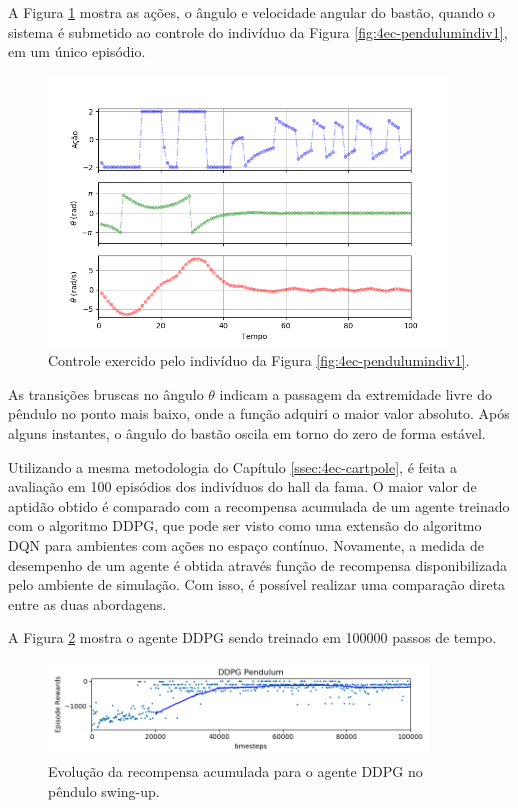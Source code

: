 A Figura \ref{fig:4ec-pendulumgraficosaval} mostra as ações, o ângulo e velocidade angular do bastão, quando o sistema é submetido ao controle do indivíduo da Figura \ref{fig:4ec-pendulumindiv1}, em um único episódio.

\begin{figure}[H]
	\centering
	\includegraphics[width=0.95\textwidth]{02_desenvolvimento/04_EC_Fig_PendulumGraficosAval.png}
	\caption{Controle exercido pelo indivíduo da Figura \ref{fig:4ec-pendulumindiv1}.}
	\label{fig:4ec-pendulumgraficosaval}
\end{figure}

As transições bruscas no ângulo $\theta$ indicam a passagem da extremidade livre do pêndulo no ponto mais baixo, onde a função adquiri o maior valor absoluto. Após alguns instantes, o ângulo do bastão oscila em torno do zero de forma estável.

Utilizando a mesma metodologia do Capítulo \ref{ssec:4ec-cartpole}, é feita a avaliação em 100 episódios dos indivíduos do hall da fama. O maior valor de aptidão obtido é comparado com a recompensa acumulada de um agente treinado com o algoritmo DDPG, que pode ser visto como uma extensão do algoritmo DQN para ambientes com ações no espaço contínuo. Novamente, a medida de desempenho de um agente é obtida através função de recompensa disponibilizada pelo ambiente de simulação. Com isso, é possível realizar uma comparação direta entre as duas abordagens.

A Figura \ref{fig:4ec-pendulumddpggraf} mostra o agente DDPG sendo treinado em 100000 passos de tempo.

\begin{figure}[H]
	\centering
	\includegraphics[width=0.9\textwidth]{02_desenvolvimento/04_EC_Fig_PendulumDDPGGraf.png}
	\caption{Evolução da recompensa acumulada para o agente DDPG no pêndulo swing-up.}
	\label{fig:4ec-pendulumddpggraf}
\end{figure}

